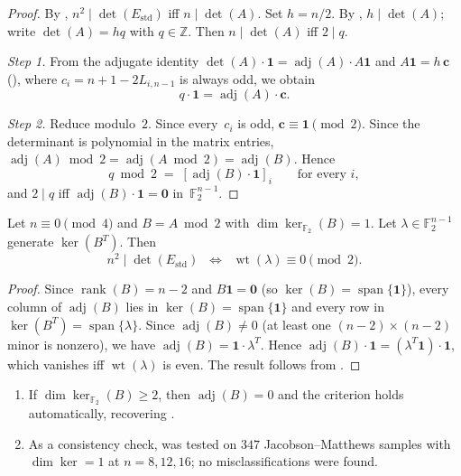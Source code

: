 \documentclass[11pt,a4paper]{article}
\newcommand{\ZZ}{\mathbb{Z}}
\newcommand{\FF}{\mathbb{F}}
\newcommand{\one}{\mathbf{1}}
\newcommand{\rank}{\operatorname{rank}}
\newcommand{\adj}{\operatorname{adj}}
\newcommand{\wt}{\operatorname{wt}}
\newcommand{\Estd}{E_{\mathrm{std}}}
\begin{document}
\begin{proof}
By , $n^2\mid\det(\Estd)$ iff $n\mid\det(A)$.
Set $h=n/2$.  By , $h\mid\det(A)$; write
$\det(A)=hq$ with $q\in\ZZ$.  Then $n\mid\det(A)$ iff $2\mid q$.

\medskip\noindent\emph{Step 1.}
From the adjugate identity $\det(A)\cdot\one = \adj(A)\cdot A\one$
and $A\one = h\,\mathbf{c}$ (), where
$c_i = n+1-2L_{i,n-1}$ is always odd, we obtain
\[
  q\cdot\one = \adj(A)\cdot\mathbf{c}.
\]

\medskip\noindent\emph{Step 2.}
Reduce modulo~$2$.  Since every~$c_i$ is odd,
$\mathbf{c}\equiv\one\pmod{2}$.  Since the determinant is polynomial
in the matrix entries, $\adj(A)\bmod 2 = \adj(A\bmod 2) = \adj(B)$.
Hence
\[
  q \bmod 2 \;=\; [\adj(B)\cdot\one]_i  \qquad\text{for every } i,
\]
and $2\mid q$ iff $\adj(B)\cdot\one = \mathbf{0}$ in~$\FF_2^{n-1}$.
\end{proof}

\begin{corollary}\label{cor:left-kernel}
Let $n\equiv 0\pmod{4}$ and $B=A\bmod 2$ with
$\dim\ker_{\FF_2}(B)=1$.  Let $\lambda\in\FF_2^{n-1}$ generate
$\ker(B^T)$.  Then
\[
  n^2\mid\det(\Estd)
  \;\;\Longleftrightarrow\;\;
  \wt(\lambda)\equiv 0\pmod{2}.
\]
\end{corollary}

\begin{proof}
Since $\rank(B)=n{-}2$ and $B\one=\mathbf{0}$ (so
$\ker(B)=\operatorname{span}\{\one\}$), every column of $\adj(B)$
lies in $\ker(B)=\operatorname{span}\{\one\}$ and every row in
$\ker(B^T)=\operatorname{span}\{\lambda\}$.
Since $\adj(B)\ne 0$ (at least one $(n{-}2)\times(n{-}2)$ minor is
nonzero), we have $\adj(B)=\one\cdot\lambda^T$.
Hence $\adj(B)\cdot\one=(\lambda^T\one)\cdot\one$, which
vanishes iff $\wt(\lambda)$ is even.
The result follows from .
\end{proof}

\begin{remark}\label{rem:adjugate-special}
\begin{enumerate}[label=\textup{(\roman*)}]
  \item If $\dim\ker_{\FF_2}(B)\ge 2$, then $\adj(B)=0$ and the
        criterion holds automatically, recovering
        .
  \item As a consistency check,  was tested on
        $347$ Jacobson--Matthews samples with $\dim\ker=1$
        at $n=8,12,16$; no misclassifications were found.
\end{enumerate}
\end{remark}
\end{document}
